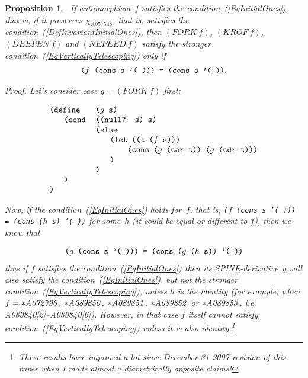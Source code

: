\documentclass[11pt]{article} %
\newtheorem{propo}{Proposition}
\newcommand{\eqn}[1]{(\ref{#1})}
\newcommand{\eeq}{\end{equation}}
\newcommand{\beql}[1]{\begin{equation}\label{#1}}
\newcommand{\autname}[1]{{\it *#1}}
\newcommand{\autletter}[1]{$#1$}
\newcommand{\automorphismlet}[1]{automorphism~\autletter{#1}}
\newcommand{\charfun}[1]{\ensuremath{\chi_{{#1}}}}
\newcommand{\charfunforcdrnil}{\charfun{A057548}}
\newcommand{\scmcode}[1]{{\tt{#1}}}
\newcommand{\scmcodeintext}[1]{{\tt{#1}}}
\newenvironment{scmdefinefun}{\begin{tabular}{l l l p{5cm}}}{\end{tabular}}
\newenvironment{scmdefinefun7}{\begin{tabular}{l l l l l l l}}{\end{tabular}}
\begin{document}
\begin{propo}~\label{recursive_derivations_of_InitialOne_preserving_automorphisms}
\normalfont
If \automorphismlet{f} satisfies the condition~\eqn{EqInitialOnes},
that is, if it preserves {\charfunforcdrnil},
that is, satisfies the condition~\eqn{DefInvariantInitialOnes},
then $(FORK~f)$, $(KROF~f)$, $(DEEPEN~f)$ and $(NEPEED~f)$
satisfy the stronger condition~\eqn{EqVerticallyTelescoping} only if
\beql{Condition_WWW}
\begin{scmdefinefun}
\scmcode{($f$ (cons s '( ))) = (cons s '( ))}.
\end{scmdefinefun}
\eeq

\textit{Proof.} Let's consider case $g = (FORK~f)$ first:

\beql{WWW_SchemeCodeFor_g_FORK_f}
\begin{scmdefinefun7}

\multicolumn{2}{l}{\scmcode{(define}} & \multicolumn{2}{l}{\scmcode{($g$ s)}}\\
 & \scmcode{(cond} & \multicolumn{3}{l}{\scmcode{((null? s) s)}}\\
 &                 & \multicolumn{2}{l}{\scmcode{(else}}\\
 &                 & & \multicolumn{2}{l}{\scmcode{(let ((t ($f$ s)))}}\\
 &                 & & & \scmcode{(cons ($g$ (car t)) ($g$ (cdr t)))}\\
 &                 & & \scmcode{)}\\
& & \scmcode{)}\\
& \scmcode{)}\\
\scmcode{)}\\

\end{scmdefinefun7}
\eeq

Now, if  the condition~\eqn{EqInitialOnes} holds for~$f$, that is,
\scmcodeintext{($f$ (cons s '( ))) = (cons ($h$ s) '( ))} for some~$h$
(it could be equal or different to $f$),
then we know that

\beql{Proof_WWW}
\begin{scmdefinefun}
\scmcode{($g$ (cons s '( ))) = (cons ($g$ ($h$ s)) '( ))}
\end{scmdefinefun}
\eeq
thus if $f$ satisfies the condition~\eqn{EqInitialOnes}
then its SPINE-derivative~$g$ will also satisfy the
condition~\eqn{EqInitialOnes},
but not the stronger condition~\eqn{EqVerticallyTelescoping},
unless $h$ is the identity (for example, when
$f = \autname{A072796}$, $\autname{A089850}$, $\autname{A089851}$,
$\autname{A089852}$ or $\autname{A089853}$, i.e. A089840[2]--A089840[6]).
However, in that case $f$ itself cannot satisfy
condition~\eqn{EqVerticallyTelescoping} unless it is also
identity.\footnote{These results have improved a lot
since December 31 2007 revision of this paper when I made almost
a diametrically opposite claims!}


\end{propo}
\end{document}
